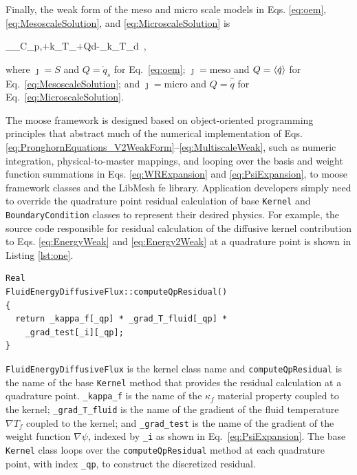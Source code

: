 Finally, the weak form of the meso and micro scale models in Eqs. \eqref{eq:oem}, \eqref{eq:MesoscaleSolution}, and \eqref{eq:MicroscaleSolution} is

\beq
\label{eq:MultiscaleWeak}
\int_\Omega\left\lbrack\rho_\jmath C_{p,\jmath}\psi+k_\jmath\nabla T_\jmath\cdot\nabla\psi+Q\psi\right\rbrack d\Omega-\int_\Gamma k_\jmath\nabla T_\jmath\cdot{}\psi d\ ,
\eeq

\noindent where \(\jmath=S\) and \(Q=\dot{q}_s\) for Eq.\ \eqref{eq:oem}; \(\jmath=\text{meso}\) and \(Q=\langle\dot{q}\rangle\) for Eq.\ \eqref{eq:MesoscaleSolution}; and \(\jmath=\text{micro}\) and \(Q=\hat{\dot{q}}\) for Eq.\ \eqref{eq:MicroscaleSolution}.

The \gls{moose} framework is designed based on object-oriented programming principles that abstract much of the numerical implementation of Eqs. \eqref{eq:PronghornEquations_V2WeakForm}--\eqref{eq:MultiscaleWeak}, such as numeric integration, physical-to-master mappings, and looping over the basis and weight function summations in Eqs. \eqref{eq:WRExpansion} and \eqref{eq:PsiExpansion}, to \gls{moose} framework classes and the LibMesh \gls{fe} library. Application developers simply need to override the quadrature point residual calculation of base \texttt{Kernel} and \texttt{BoundaryCondition} classes to represent their desired physics. For example, the source code responsible for residual calculation of the diffusive kernel contribution to Eqs. \eqref{eq:EnergyWeak} and \eqref{eq:Energy2Weak} at a quadrature point is shown in Listing \ref{lst:one}.

\vspace{1em}
\begin{minipage}[c]{0.92\linewidth}
\begin{lstlisting}[caption={Pronghorn source code calculation of \(\int_\Omega\kappa_f\nabla T_f\cdot\nabla\psi d\Omega\).},captionpos=b,label={lst:one}]
Real
FluidEnergyDiffusiveFlux::computeQpResidual()
{
  return _kappa_f[_qp] * _grad_T_fluid[_qp] *
    _grad_test[_i][_qp];
}
\end{lstlisting}
\end{minipage}

\texttt{FluidEnergyDiffusiveFlux} is the kernel class name and \texttt{computeQpResidual} is the name of the base \texttt{Kernel} method that provides the residual calculation at a quadrature point. \texttt{\_kappa\_f} is the name of the \(\kappa_f\) material property coupled to the kernel; \texttt{\_grad\_T\_fluid} is the name of the gradient of the fluid temperature \(\nabla T_f\) coupled to the kernel; and \texttt{\_grad\_test} is the name of the gradient of the weight function \(\nabla\psi\), indexed by \texttt{\_i} as shown in Eq.\ \eqref{eq:PsiExpansion}. The base \texttt{Kernel} class loops over the \texttt{computeQpResidual} method at each quadrature point, with index \texttt{\_qp}, to construct the discretized residual.

